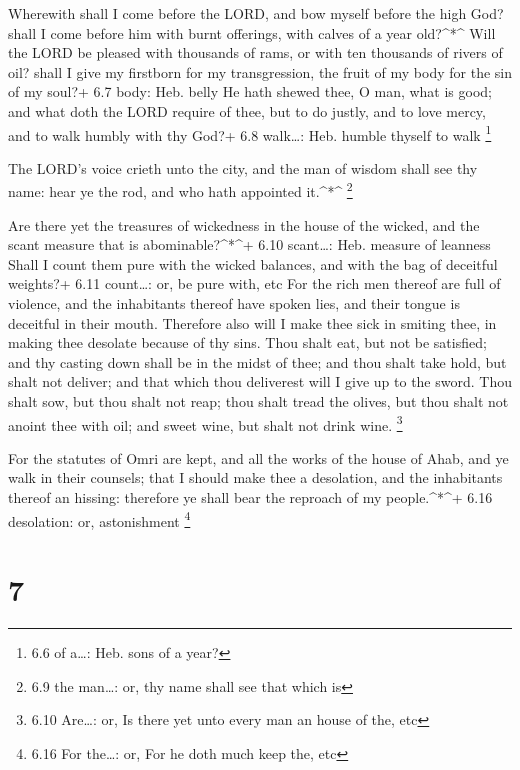  Wherewith shall I come before the LORD, and bow myself
before the high God? shall I come before him with burnt offerings, with
calves of a year old?\^{}*\^{}  Will the LORD be pleased
with thousands of rams, or with ten thousands of rivers of oil? shall I
give my firstborn for my transgression, the fruit of my body for the sin
of my soul?+ 6.7 body: Heb. belly  He hath shewed thee, O
man, what is good; and what doth the LORD require of thee, but to do
justly, and to love mercy, and to walk humbly with thy God?+ 6.8
walk\ldots: Heb. humble thyself to walk \footnote{6.6 of a\ldots: Heb.
  sons of a year?}

 The LORD's voice crieth unto the city, and the man of
wisdom shall see thy name: hear ye the rod, and who hath appointed
it.\^{}*\^{} \footnote{6.9 the man\ldots: or, thy name shall see that
  which is}

 Are there yet the treasures of wickedness in the house of
the wicked, and the scant measure that is abominable?\^{}*\^{}+ 6.10
scant\ldots: Heb. measure of leanness  Shall I count them
pure with the wicked balances, and with the bag of deceitful weights?+
6.11 count\ldots: or, be pure with, etc  For the rich men
thereof are full of violence, and the inhabitants thereof have spoken
lies, and their tongue is deceitful in their mouth. 
Therefore also will I make thee sick in smiting thee, in making thee
desolate because of thy sins.  Thou shalt eat, but not be
satisfied; and thy casting down shall be in the midst of thee; and thou
shalt take hold, but shalt not deliver; and that which thou deliverest
will I give up to the sword.  Thou shalt sow, but thou
shalt not reap; thou shalt tread the olives, but thou shalt not anoint
thee with oil; and sweet wine, but shalt not drink wine. \footnote{6.10
  Are\ldots: or, Is there yet unto every man an house of the, etc}

 For the statutes of Omri are kept, and all the works of
the house of Ahab, and ye walk in their counsels; that I should make
thee a desolation, and the inhabitants thereof an hissing: therefore ye
shall bear the reproach of my people.\^{}*\^{}+ 6.16 desolation: or,
astonishment \footnote{6.16 For the\ldots: or, For he doth much keep
  the, etc}

\hypertarget{section-6}{%
\section{7}\label{section-6}}

